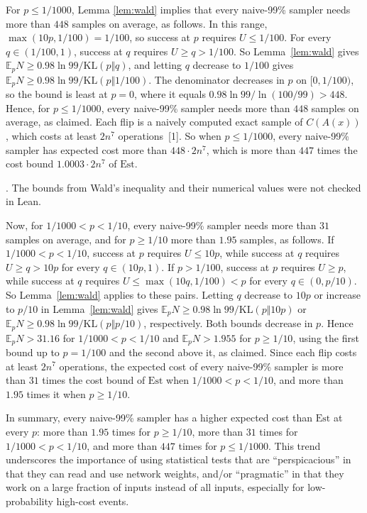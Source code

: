 \documentclass[10pt]{article}
\newcommand{\leanmark}[1]{{\relscale{0.78}\color{gray}[#1]}}
\newenvironment{leanitems}{\par\smallskip\relscale{0.78}\color{gray}\hypersetup{urlcolor=gray}\raggedright%
  \begin{list}{}{\setlength{\leftmargin}{2em}\setlength{\labelwidth}{1.6em}%
  \setlength{\labelsep}{0.4em}\setlength{\itemsep}{0pt}\setlength{\topsep}{0pt}%
  \setlength{\parsep}{0pt}}}{\end{list}\par\medskip}
\newcommand{\Est}{\mathrm{Est}}
\newcommand{\EE}{\mathbb{E}}
\begin{document}
For $p\le1/1000$, Lemma \ref{lem:wald} implies that every naive-99\% sampler needs more than $448$ samples on
average, as follows. In this range, $\max(10p,1/100)=1/100$, so success at
$p$ requires $U\le1/100$. For every $q\in(1/100,1)$, success at $q$ requires
$U\ge q>1/100$. So Lemma~\ref{lem:wald} gives
$\EE_pN\ge0.98\ln99/\mathrm{KL}(p\Vert q)$, and letting $q$ decrease to $1/100$
gives $\EE_pN\ge0.98\ln99/\mathrm{KL}(p\Vert1/100)$. The denominator decreases
in $p$ on $[0,1/100)$, so the bound is least at $p=0$, where it equals
$0.98\ln99/\ln(100/99)>448$. Hence, for $p\le1/1000$, every naive-99\%
sampler needs more than $448$ samples on average, as claimed.
Each flip is a naively computed exact sample of $C(A(x))$, which costs at
least $2n^7$ operations~\leanmark{1}. So when $p\le1/1000$, every naive-99\%
sampler has expected cost more than $448\cdot2n^7$, which is more than $447$
times the cost bound $1.0003\cdot2n^7$ of $\Est$.

\begin{leanitems}
. The bounds from Wald's inequality and
their numerical values were not checked in Lean.
\end{leanitems}


Now, for $1/1000<p<1/10$, every naive-99\% sampler needs more than $31$ samples on
average, and for $p\ge1/10$ more than $1.95$ samples, as follows. If
$1/1000<p<1/10$, success at $p$ requires $U\le10p$, while success at
$q$ requires $U\ge q>10p$ for every $q\in(10p,1)$. If $p>1/100$, success at
$p$ requires $U\ge p$, while success at $q$ requires
$U\le\max(10q,1/100)<p$ for every $q\in(0,p/10)$. So Lemma~\ref{lem:wald} applies to these pairs.
Letting $q$ decrease to $10p$ or increase to $p/10$ in Lemma~\ref{lem:wald}
gives $\EE_pN\ge0.98\ln99/\mathrm{KL}(p\Vert10p)$ or
$\EE_pN\ge0.98\ln99/\mathrm{KL}(p\Vert p/10)$, respectively. Both bounds
decrease in $p$. Hence $\EE_pN>31.16$ for $1/1000<p<1/10$ and $\EE_pN>1.955$
for $p\ge1/10$, using the first bound up to $p=1/100$ and the second above it,
as claimed.
Since each flip costs at least $2n^7$ operations, the expected cost of every
naive-99\% sampler
is more than $31$ times the cost bound of $\Est$ when $1/1000<p<1/10$, and
more than $1.95$ times it when $p\ge1/10$. 


In summary, every naive-99\% sampler has a higher expected cost than $\Est$
at every $p$: more than $1.95$ times for $p\ge1/10$, more than $31$ times for
$1/1000<p<1/10$, and more than $447$ times for $p\le1/1000$. This trend underscores the
importance of using statistical tests that are ``perspicacious'' in that they
can read and use network weights, and/or ``pragmatic'' in that they work on a large
fraction of inputs instead of all inputs, especially for low-probability
high-cost events.
\end{document}
